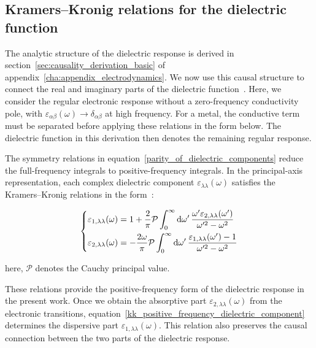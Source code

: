 \FloatBarrier
\subsection{Kramers--Kronig relations for the dielectric function}

The analytic structure of the dielectric response is derived in section~\ref{sec:causality_derivation_basic} of appendix~\ref{cha:appendix_electrodynamics}.
We now use this causal structure to connect the real and imaginary parts of the dielectric function~\cite{toll1956causality}.
Here, we consider the regular electronic response without a zero-frequency conductivity pole,
with $\varepsilon_{\alpha\beta}(\omega)\to\delta_{\alpha\beta}$ at high frequency.
For a metal, the conductive term must be separated before applying these relations in the form below.
The dielectric function in this derivation then denotes the remaining regular response.

The symmetry relations in equation~\eqref{parity_of_dielectric_components} reduce the full-frequency integrals to positive-frequency integrals.
In the principal-axis representation,
each complex dielectric component $\varepsilon_{\lambda\lambda}(\omega)$ satisfies the Kramers--Kronig relations in the form~\cite{ossikovski2021constitutive}:

\begin{equation}
\left\{\begin{aligned}
    \varepsilon_{1,\lambda\lambda}(\omega) &=
    1+\frac{2}{\mathrm{\pi}}\mathcal{P}
    \int_{0}^{\infty}\mathrm{d}{\omega'}\,
    \frac{\omega'\varepsilon_{2,\lambda\lambda}(\omega')}{\omega'^2-\omega^2} \\
    \varepsilon_{2,\lambda\lambda}(\omega) &=
    -\frac{2\omega}{\mathrm{\pi}}\mathcal{P}
    \int_{0}^{\infty}\mathrm{d}{\omega'}\,
    \frac{\varepsilon_{1,\lambda\lambda}(\omega')-1}{\omega'^2-\omega^2}  
\end{aligned}\right.
\label{kk_positive_frequency_dielectric_component}
\end{equation}

here, $\mathcal{P}$ denotes the Cauchy principal value.

These relations provide the positive-frequency form of the dielectric response in the present work.
Once we obtain the absorptive part $\varepsilon_{2,\lambda\lambda}(\omega)$ from the electronic transitions,
equation~\eqref{kk_positive_frequency_dielectric_component} determines the dispersive part $\varepsilon_{1,\lambda\lambda}(\omega)$.
This relation also preserves the causal connection between the two parts of the dielectric response.

